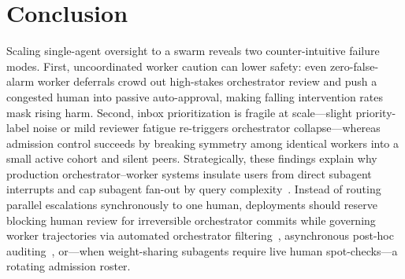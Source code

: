 \documentclass[11pt,reqno]{amsart}
\theoremstyle{spacious}
\newcommand{\Wtxt}[1]{\textcolor{colW}{#1}}
\newcommand{\Ftxt}[1]{\textcolor{colF}{#1}}
\newcommand{\Htxt}[1]{\textcolor{colH}{#1}}
\begin{document}
\section{Conclusion}
\label{sec:conclusion}

Scaling single-agent oversight to a swarm reveals two counter-intuitive failure modes. First, uncoordinated \Wtxt{worker} caution can lower safety: even zero-false-alarm \Wtxt{worker} deferrals crowd out high-stakes \Ftxt{orchestrator} review and push a congested \Htxt{human} into passive auto-approval, making falling intervention rates mask rising harm. Second, inbox prioritization is fragile at scale---slight priority-label noise or mild \Htxt{reviewer} fatigue re-triggers \Ftxt{orchestrator} collapse---whereas admission control succeeds by breaking symmetry among identical \Wtxt{workers} into a small active cohort and silent peers. Strategically, these findings explain why production orchestrator--worker systems insulate users from direct subagent interrupts and cap subagent fan-out by query complexity~\cite{anthropic2025research}. Instead of routing parallel escalations synchronously to one \Htxt{human}, deployments should reserve blocking \Htxt{human} review for irreversible \Ftxt{orchestrator} commits while governing \Wtxt{worker} trajectories via automated \Ftxt{orchestrator} filtering~\cite{anthropic2025research}, asynchronous post-hoc auditing~\cite{lindner2025control}, or---when weight-sharing subagents require live \Htxt{human} spot-checks---a rotating admission roster.
\end{document}
